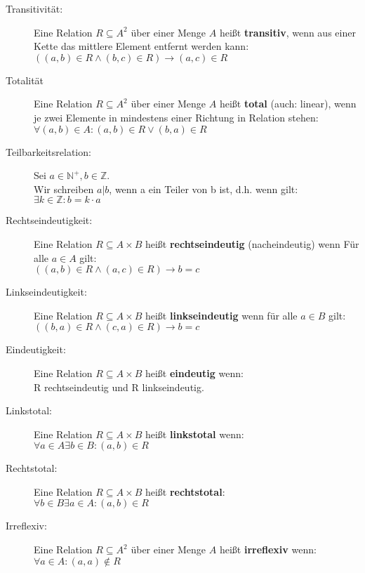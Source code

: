 \begin{description}
  \item [Transitivität:] 
    Eine Relation $R \subseteq A^2$ über einer Menge $A$ heißt \textbf{transitiv}, 
    wenn aus einer Kette das mittlere Element entfernt werden kann:\\
    $((a,b) \in R \wedge (b,c) \in R) \rightarrow (a,c) \in R$

  \item [Totalität] 
    Eine Relation $R \subseteq A^2$ über einer Menge $A$ heißt \textbf{total} 
    (auch: linear), wenn je zwei Elemente in mindestens einer Richtung in 
    Relation stehen: \\
    $\forall (a,b) \in A : (a,b) \in R \vee (b,a) \in R$

  \item [Teilbarkeitsrelation:] 
    Sei $a \in \mathbb{N}^+, b \in \mathbb{Z}$.\\
    Wir schreiben $a|b$, wenn \dq{}a ein Teiler von b\dq{} ist, d.h. wenn gilt:\\
    $\exists k \in \mathbb{Z} : b = k \cdot a$

  \item [Rechtseindeutigkeit:]
    Eine Relation $R \subseteq A \times B$ heißt \textbf{rechtseindeutig} 
    (nacheindeutig) wenn Für alle $a \in A$ gilt:\\
    $((a,b) \in R \wedge (a,c) \in R) \rightarrow b = c$

  \item [Linkseindeutigkeit:]
    Eine Relation $R \subseteq A \times B$ heißt \textbf{linkseindeutig} wenn
    für alle $a \in B$ gilt: \\
    $((b,a) \in R \wedge (c,a) \in R) \rightarrow b = c$

  \item [Eindeutigkeit:]
    Eine Relation $R \subseteq A \times B$ heißt \textbf{eindeutig} wenn:\\
    R rechtseindeutig und R linkseindeutig.

  \item [Linkstotal:]
    Eine Relation $R \subseteq A \times B$ heißt \textbf{linkstotal} wenn: \\
    $\forall a \in A \exists b \in B : (a,b) \in R$

  \item [Rechtstotal:] 
    Eine Relation $R \subseteq A \times B$ heißt \textbf{rechtstotal}:\\
    $\forall b \in B \exists a \in A : (a,b) \in R$

  \item [Irreflexiv:]
    Eine Relation $R \subseteq A^2$ über einer Menge $A$ heißt 
    \textbf{irreflexiv} wenn:\\
    $\forall a \in A : (a,a) \notin R$


\end{description}
